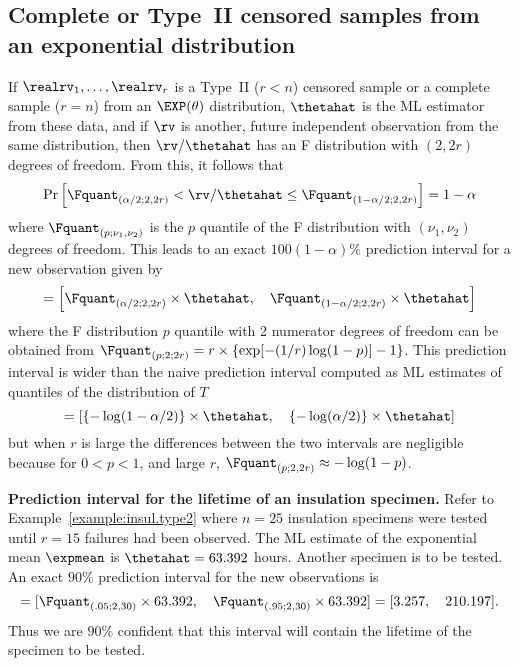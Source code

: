 \subsection{Complete or Type~II censored samples from an
exponential distribution} If $\realrv_{1}, \dots, \realrv_{r}$ is a
Type~II ($r<n$) censored sample or a complete sample ($r=n$) from an
$\EXP(\theta)$ distribution, $\thetahat$ is the ML estimator from
these data, and if $\rv$ is another, future independent observation
from the same distribution, then $\rv/\thetahat$ has an F
distribution with $(2,2r)$ degrees of freedom.  From this, it follows
that
\begin{displaymath}
\Pr
\left [
\Fquant_{(\alpha/2; 2, 2r)} <
\rv / \thetahat \le 
\Fquant_{(1-\alpha/2; 2, 2r)}
\right ]=1-\alpha
\end{displaymath}
where $\Fquant_{(p; \nu_{1} , \nu_{2})}$ is the $p$ quantile of the
F distribution with $(\nu_{1},\nu_{2})$
degrees of freedom.  This leads to an exact $100(1-\alpha)\%$
prediction interval for a new observation given by
\begin{displaymath}
[\Tlower, \quad \Tupper]
=
\left [
\Fquant_{(\alpha/2; 2, 2r)} \times \thetahat, 
\quad
\Fquant_{(1-\alpha/2; 2, 2r)} \times \thetahat 
\right ]
\end{displaymath}
where the F distribution $p$ quantile with 2 numerator degrees of
freedom can be obtained from $\Fquant_{(p;2;2r)}=r \times \left \{
\exp[ -(1/r) \log(1-p)]-1
                       \right \}$.
This prediction interval is wider than the
naive prediction interval computed as ML estimates
of quantiles of the distribution of $T$
\begin{displaymath}
[\rvquanhat_{\alpha/2},\quad\rvquanhat_{1-\alpha/2}]
=
\left [
\{-\log(1-\alpha/2)\} \times \thetahat, \quad
 \{-\log(\alpha/2)\} \times \thetahat
\right ]
\end{displaymath}
but when $r$
is large 
the differences between the two intervals are negligible because  
for $0<p<1$, and large $r$, $\Fquant_{(p;2,2r)} \approx -\log(1-p)$.
\begin{example}
\label{example:prediction.typeiidata.exponential}
{\bf Prediction interval for the lifetime of an insulation
specimen.}  Refer to Example~\ref{example:insul.type2} where $n=25$
insulation specimens were tested until $r=15$ failures had been
observed. The ML estimate of the exponential mean $\expmean$ is
$\thetahat=63.392$ hours.  Another specimen is to be tested. An
exact $90\%$ prediction interval for the new observations is
\begin{displaymath}
[\Tlower, \quad \Tupper]=[\Fquant_{(.05;2,30)} \times 63.392, \quad
\Fquant_{(.95;2,30)}\times63.392]=[3.257, \quad 210.197]. 
\end{displaymath}
Thus we are $90\%$ confident that this interval will contain the
lifetime of the specimen to be tested.
\end{example}

